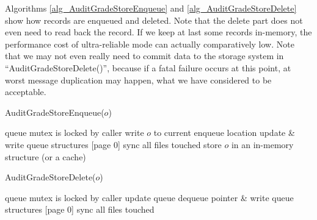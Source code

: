 \documentclass[a4paper,10pt]{article}
\begin{document}
Algorithms \ref{alg_AuditGradeStoreEnqueue} and \ref{alg_AuditGradeStoreDelete} show how records are enqueued and deleted. Note that the delete part does not even need to read back the record. If we keep at last some records in-memory, the performance cost of ultra-reliable mode can actually comparatively low. Note that we may not even really need to commit data to the storage system in ``AuditGradeStoreDelete()'', because if a fatal failure occurs at this point, at worst message duplication may happen, what we have considered to be acceptable.

\begin{algorithm}
\caption{AuditGradeStoreEnqueue($o$)}
\begin{algorithmic}
\label{alg_AuditGradeStoreEnqueue}
\REQUIRE queue mutex is locked by caller
\STATE write $o$ to current enqueue location
\STATE update \& write queue structures [page 0]
\STATE sync all files touched 
\STATE store $o$ in an in-memory structure (or a cache)
\end{algorithmic}
\end{algorithm}

\begin{algorithm}
\caption{AuditGradeStoreDelete($o$)}
\begin{algorithmic}
\label{alg_AuditGradeStoreDelete}
\REQUIRE queue mutex is locked by caller
\STATE update queue dequeue pointer \& write queue structures [page 0]
\STATE sync all files touched 
\end{algorithmic}
\end{algorithm}
\end{document}
